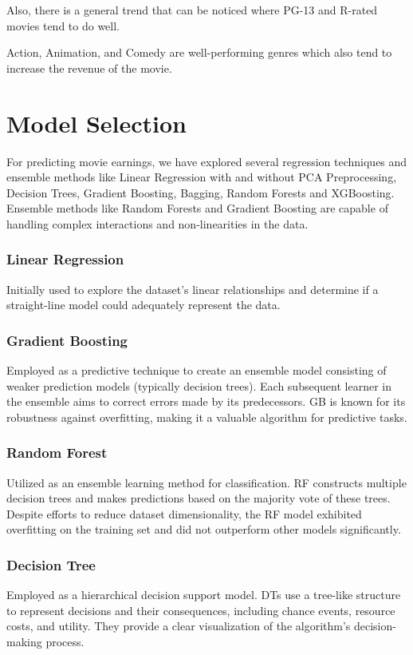 \documentclass[conference]{IEEEtran}
\begin{document}
            Also, there is a general trend that can be noticed where PG-13 and R-rated movies tend to do well.
            
            Action, Animation, and Comedy are well-performing genres which also tend to increase the revenue of the movie.

\section{Model Selection}
    For predicting movie earnings, we have explored several regression techniques and ensemble methods like Linear Regression with and without PCA Preprocessing, Decision Trees, Gradient Boosting, Bagging, Random Forests and XGBoosting.
    Ensemble methods like Random Forests and Gradient Boosting are capable of handling complex interactions and non-linearities in the data.
    
    \subsubsection{Linear Regression}
        Initially used to explore the dataset's linear relationships and determine if a straight-line model could adequately represent the data.
    
    \subsubsection{Gradient Boosting}
        Employed as a predictive technique to create an ensemble model consisting of weaker prediction models (typically decision trees). Each subsequent learner in the ensemble aims to correct errors made by its predecessors. GB is known for its robustness against overfitting, making it a valuable algorithm for predictive tasks.
    
    \subsubsection{Random Forest}
        Utilized as an ensemble learning method for classification. RF constructs multiple decision trees and makes predictions based on the majority vote of these trees. Despite efforts to reduce dataset dimensionality, the RF model exhibited overfitting on the training set and did not outperform other models significantly.
    
    \subsubsection{Decision Tree}
        Employed as a hierarchical decision support model. DTs use a tree-like structure to represent decisions and their consequences, including chance events, resource costs, and utility. They provide a clear visualization of the algorithm's decision-making process.
    
\end{document}
